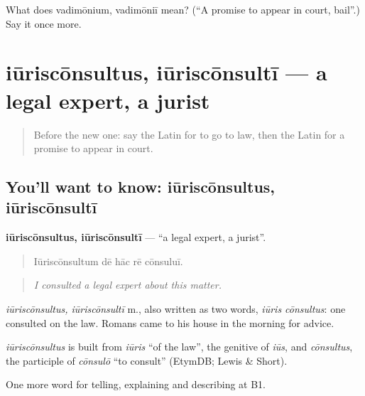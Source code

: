 \begin{tcolorbox}[breakable,colback=teal!4,colframe=teal!35!black,title={Before you move on}]
What does vadimōnium, vadimōniī mean? (\textquotedblleft{}A promise to appear in court, bail\textquotedblright{}.) Say it once more.
\end{tcolorbox}
\section[iūriscōnsultus, iūriscōnsultī]{iūriscōnsultus, iūriscōnsultī — a legal expert, a jurist}

\label{lesson:LA-C411-iurisconsultus}



\begin{quote}
Before the new one: say the Latin for to go to law, then the Latin for a promise to appear in court.
\end{quote}

\subsection*{You'll want to know: iūriscōnsultus, iūriscōnsultī}
\textbf{iūriscōnsultus, iūriscōnsultī} — \textquotedblleft{}a legal expert, a jurist\textquotedblright{}.

\begin{quote}
Iūriscōnsultum dē hāc rē cōnsuluī.
\end{quote}

\begin{quote}
\emph{I consulted a legal expert about this matter.}
\end{quote}

\emph{iūriscōnsultus, iūriscōnsultī} m., also written as two words, \emph{iūris cōnsultus}: one consulted on the law. Romans came to his house in the morning for advice.

\begin{cousinweb}
\emph{iūriscōnsultus} is built from \emph{iūris} \textquotedblleft{}of the law\textquotedblright{}, the genitive of \emph{iūs}, and \emph{cōnsultus}, the participle of \emph{cōnsulō} \textquotedblleft{}to consult\textquotedblright{} (EtymDB; Lewis \& Short).
\end{cousinweb}

\begin{grammarlens}[title={What you've built}]
One more word for telling, explaining and describing at B1.
\end{grammarlens}

